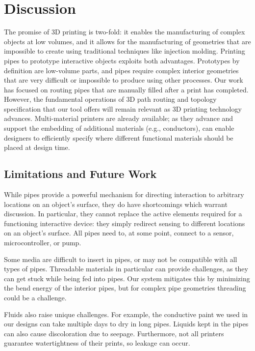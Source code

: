 \section{Discussion}

The promise of 3D printing is two-fold: it enables the manufacturing of complex objects at low volumes, and it allows for the manufacturing of geometries that are impossible to create using traditional techniques like injection molding.  Printing pipes to prototype interactive objects exploits both advantages. Prototypes by definition are low-volume parts, and pipes require complex interior geometries that are very difficult or impossible to produce using other processes. Our work has focused on routing pipes that are manually filled after a print has completed. However, the fundamental operations of 3D path routing and topology specification that our tool offers will remain relevant as 3D printing technology advances. Multi-material printers are already available; as they advance and support the embedding of additional materials (e.g., conductors), \systemname can enable designers to efficiently specify where different functional materials should be placed at design time.

\subsection{Limitations and Future Work}
While pipes provide a powerful mechanism for directing interaction to arbitrary locations on an object's surface, they do have shortcomings which warrant discussion.  In particular, they cannot replace the active elements required for a functioning interactive device: they simply redirect sensing to different locations on an object's surface.  All pipes need to, at some point, connect to a sensor, microcontroller, or pump. 

Some media are difficult to insert in pipes, or may not be compatible with all types of pipes.  Threadable materials in particular can provide challenges, as they can get stuck while being fed into pipes. Our system mitigates this by minimizing the bend energy of the interior pipes, but for complex pipe geometries threading could be a challenge. 

Fluids also raise unique challenges.  For example, the conductive paint we used in our designs can take multiple days to dry in long pipes. Liquids kept in the pipes can also cause discoloration due to seepage.  Furthermore, not all printers guarantee watertightness of their prints, so leakage can occur.

